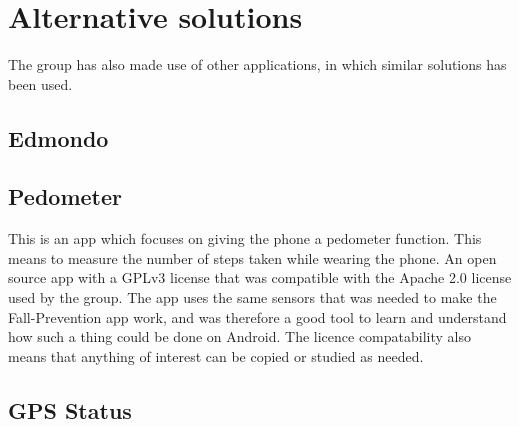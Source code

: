 \chapter{Alternative solutions}
The group has also made use of other applications, in which similar solutions has been used. 

\section{Edmondo}

\section{Pedometer}
This is an app which focuses on giving the phone a pedometer function. This means to measure the number of steps taken while wearing the phone.
An open source app with a GPLv3 license that was compatible with the Apache 2.0 license used by the group. The app uses the same sensors that was needed to make the Fall-Prevention app work, and was therefore a good tool to learn and understand how such a thing could be done on Android. The licence compatability also means that anything of interest can be copied or studied as needed.


\section{GPS Status}